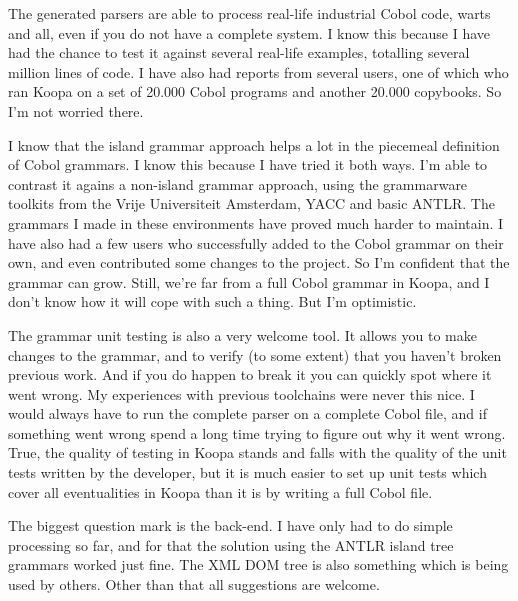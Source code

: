 \documentclass[a4paper]{article}
\begin{document}
The generated parsers are able to process real-life industrial Cobol code, warts and all, even if you do not have a complete system. I know this because I have had the chance to test it against several real-life examples, totalling several million lines of code. I have also had reports from several users, one of which who ran Koopa on a set of 20.000 Cobol programs and another 20.000 copybooks. So I'm not worried there.

I know that the island grammar approach helps a lot in the piecemeal definition of Cobol grammars. I know this because I have tried it both ways. I'm able to contrast it agains a non-island grammar approach, using the grammarware toolkits from the Vrije Universiteit Amsterdam, YACC and basic ANTLR. The grammars I made in these environments have proved much harder to maintain. I have also had a few users who successfully added to the Cobol grammar on their own, and even contributed some changes to the project. So I'm confident that the grammar can grow. Still, we're far from a full Cobol grammar in Koopa, and I don't know how it will cope with such a thing. But I'm optimistic.

The grammar unit testing is also a very welcome tool. It allows you to make changes to the grammar, and to verify (to some extent) that you haven't broken previous work. And if you do happen to break it you can quickly spot where it went wrong. My experiences with previous toolchains were never this nice. I would always have to run the complete parser on a complete Cobol file, and if something went wrong spend a long time trying to figure out why it went wrong. True, the quality of testing in Koopa stands and falls with the quality of the unit tests written by the developer, but it is much easier to set up unit tests which cover all eventualities in Koopa than it is by writing a full Cobol file.

The biggest question mark is the back-end. I have only had to do simple processing so far, and for that the solution using the ANTLR island tree grammars worked just fine. The XML DOM tree is also something which is being used by others. Other than that all suggestions are welcome.





\end{document}
